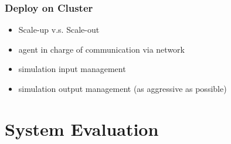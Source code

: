 \documentclass{beamer}
\begin{document}
\begin{frame}
\frametitle{Deploy on Cluster}
\begin{itemize}
\item Scale-up v.s. Scale-out
\item agent in charge of communication via network
\item simulation input management
\begin{algorithmic}[1]
    \EndFor
  \Else
  \EndIf
\EndWhile
\end{algorithmic}
\item simulation output management (as aggressive as possible)
\end{itemize}
\end{frame}

\section{System Evaluation}
\end{document}
